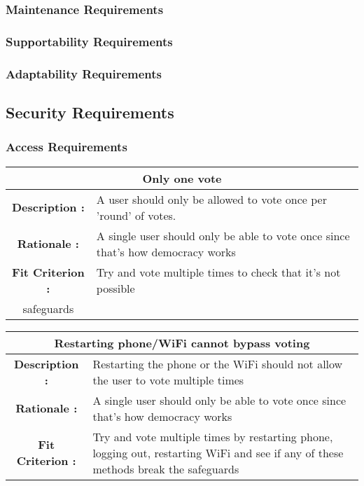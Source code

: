\documentclass[12pt, titlepage]{article}
\begin{document}
\subsubsection{Maintenance Requirements}
\subsubsection{Supportability Requirements}
\subsubsection{Adaptability Requirements}

\subsection{Security Requirements}
\subsubsection{Access Requirements}

\begin{center}
\begin{table}[H]
\begin{tabularx}{\textwidth}{| c X |}
\hline
\multicolumn{2}{|c|}{\textbf{Only one vote}}\\
\hline
\textbf{Description : } & A user should only be allowed to vote once per 'round'
of votes.\\
\hline
\textbf{Rationale : } & A single user should only be able to vote once since
that's how democracy works\\
\hline
\textbf{Fit Criterion : } & Try and vote multiple times to check that it's not
possible\\
safeguards\\
\hline
\end{tabularx}
\end{table}
\end{center}

\begin{center}
\begin{table}[H]
\begin{tabularx}{\textwidth}{| c X |}
\hline
\multicolumn{2}{|c|}{\textbf{Restarting phone/WiFi cannot bypass voting}}\\
\hline
\textbf{Description : } & Restarting the phone or the WiFi should not allow
the user to vote multiple times\\
\hline
\textbf{Rationale : } & A single user should only be able to vote once since
that's how democracy works\\
\hline
\textbf{Fit Criterion : } & Try and vote multiple times by restarting phone,
logging out, restarting WiFi and see if any of these methods break the
safeguards\\
\hline
\end{tabularx}
\end{table}
\end{center}
\end{document}

